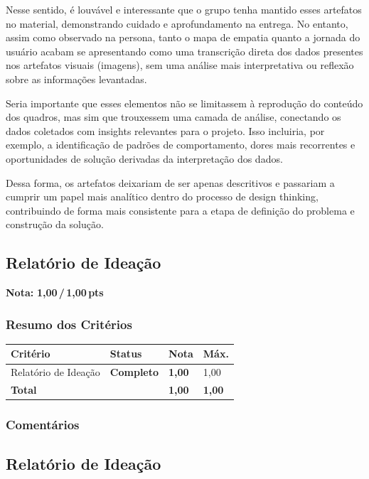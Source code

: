 \documentclass[
  sigconf,
  nonacm, %
  language=portuguese
]{acmart}
\newcommand{\notadestaque}[2]{%
  \noindent\textbf{Nota:}\enspace%
  {\large\bfseries\color{cred}#1\,/\,#2\,pts}%
}
\newcommand{\statusok}[1]{{\small\bfseries\color{cgood}#1}}
\begin{document}
Nesse sentido, é louvável e interessante que o grupo tenha mantido esses artefatos no material, demonstrando cuidado e aprofundamento na entrega. No entanto, assim como observado na persona, tanto o mapa de empatia quanto a jornada do usuário acabam se apresentando como uma transcrição direta dos dados presentes nos artefatos visuais (imagens), sem uma análise mais interpretativa ou reflexão sobre as informações levantadas.

Seria importante que esses elementos não se limitassem à reprodução do conteúdo dos quadros, mas sim que trouxessem uma camada de análise, conectando os dados coletados com insights relevantes para o projeto. Isso incluiria, por exemplo, a identificação de padrões de comportamento, dores mais recorrentes e oportunidades de solução derivadas da interpretação dos dados.

Dessa forma, os artefatos deixariam de ser apenas descritivos e passariam a cumprir um papel mais analítico dentro do processo de design thinking, contribuindo de forma mais consistente para a etapa de definição do problema e construção da solução.

\subsection{Relatório de Ideação}

\notadestaque{1,00}{1,00}

\subsubsection*{Resumo dos Critérios}

\begin{tabular}{@{} L{2.6cm} C{2.5cm} C{1.1cm} C{1.1cm} @{}}
\toprule
\textbf{Critério} & \textbf{Status} & \textbf{Nota} & \textbf{Máx.} \\
\midrule
Relatório de Ideação & \statusok{Completo} & \textbf{1,00} & 1,00 \\
\midrule
\textbf{Total} & & \textbf{\color{cred}1,00} & \textbf{1,00} \\
\bottomrule
\end{tabular}

\subsubsection*{Comentários}

\subsection{Relatório de Ideação}
\end{document}
